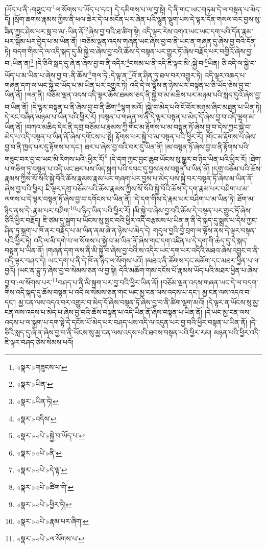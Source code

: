 །ཡོད་པ་ནི་:གཟུང་བ་\footnote{«སྣར་»གཟུངས་པ་}ལ་སོགས་པ་ཡོད་པ་དང་། དེ་དམིགས་པ་ལ་བྱ་སྟེ། དེ་ནི་གང་ཡང་གཏམ་དེ་ལ་བསྟན་པ་མེད་དོ། །སྲོག་ཆགས་རྣམས་ཀྱིས་ནི་ཕལ་ཆེར་དེ་ལ་མངོན་པར་ཞེན་པའི་ལྷུན་སྡུག་པས་དེ་ལྟར་དོན་གསལ་བར་བྱས་སུ་ཟིན་ཀྱང་ཤེས་པར་སླ་བ་མ་:ཡིན་ནོ་\footnote{«སྣར་»ཡིན་}ཞེས་བྱ་བའི་ཐ་ཚིག་སྟེ། འདི་ལྟར་རེས་འགའ་ཡང་ཡང་དག་པའི་དོན་རྣམ་པར་སྒོམ་པར་བྱེད་པ་མ་ཡིན་ནོ། །བཅོམ་ལྡན་འདས་གཞན་ཡང་ཞེས་བྱ་བ་ནི་ཡང་ན་གཞན་དུ་ཞེས་བྱ་བའི་དོན་ཏེ། བདག་གིས་དེ་ལ་འདི་སྐད་དུ་མི་སྐྱེ་བ་ཞེས་བྱ་བའི་ཆོས་དེ་བསྟན་པར་གྱུར་ཏོ་ཞེས་བརྗོད་པར་བགྱིའོ་ཞེས་བྱ་བ་:ཡིན་ན།\footnote{«སྣར་»ཡིན་ཏེ།} །དེ་ཅིའི་སླད་དུ་ཞེ་ན་ཞེས་བྱ་བ་ནི་འདིར་\footnote{«སྣར་»འདིས་}བསམ་པ་ནི་འདི་ཇི་ལྟར་མི་:སྐྱེ་བ་\footnote{«སྣར་»«པེ་»སྐྱེ་བ་ཡོད་པ་}ཡིན། ཅི་འདི་ལ་སྐྱེ་བ་ཡོད་པ་མ་ཡིན་པ་ཞེས་བྱ་བ་:ནི་ཆོས་\footnote{«སྣར་»«པེ་»ནི་}གལ་ཏེ་:དེ་ལྟ་ན་\footnote{«སྣར་»«པེ་»དེ་ལྟ་}འོ་ན་ཤིན་ཏུ་ཐལ་བར་འགྱུར་ཏེ། འདི་ལྟར་འཆད་པ་གཞན་དག་ལ་ཡང་སྐྱེ་བ་ཡོད་པ་མ་ཡིན་པར་འགྱུར་ཏེ། འདི་དེ་ལ་ལྟོས་ན་ཉེས་པར་བསྟན་པ་ཅི་ཡོད་ཅེས་བྱ་བ་ཡིན་ནོ། །ལན་ནི། བཅོམ་ལྡན་འདས་འདི་ལྟར་ཆོས་ཐམས་ཅད་ནི་སྐྱེ་བ་མ་མཆིས་པར་མཉམ་པའི་སླད་དུའོ་ཞེས་བྱ་བ་ཡིན་ནོ། །དེ་ལྟར་བསྟན་པ་ནི་ཞེས་བྱ་བ་ནི་ཚིག་\footnote{«སྣར་»«པེ་»ཚིག་གི་}ལྷག་མའོ། །སྐྱེ་བ་མེད་པའི་ངོ་བོར་མཉམ་ཞིང་མཐུན་པ་ཡིན་ཏེ། དེ་རང་བཞིན་མཉམ་པ་ཡིན་པའི་ཕྱིར་རོ། །བསྟན་པ་གཞན་ལ་ནི་དེ་ལྟར་བསྟན་པ་མེད་དོ་ཞེས་བྱ་བ་འདི་ལྷག་མ་ཡིན་ནོ། །བཀའ་མཆིད་དེར་ནི་དགྲ་བཅོམ་པ་རྣམས་ཀྱི་གོང་མ་རྟོགས་པ་མ་བསྟན་ཏོ་ཞེས་བྱ་བ་དེས་ཀྱང་སྐྱེ་བ་མེད་པ་འདི་བསྟན་པ་ཡིན་ནོ་ཞེས་དགོངས་པ་སྟེ། རྟོགས་པར་སྐྱེ་བ་མ་བསྟན་པའི་ཕྱིར་རོ། །གོང་མ་རྟོགས་པ་ཞེས་བྱ་བ་ནི་ཁྱད་པར་དུ་རྟོགས་པ་དང་། ཐར་པ་ཞེས་བྱ་བའི་བར་དུ་ཡིན་ནོ། །མ་བསྟན་ཏོ་ཞེས་བྱ་བ་ནི་རྟོགས་པའི་གཟུང་བར་བྱ་བ་ཡང་མི་རིགས་པའི་:ཕྱིར་རོ།\footnote{«སྣར་»«པེ་»ཕྱིར་ཏེ།} །དེ་དག་ཀྱང་བྱང་ཆུབ་ཡོངས་སུ་སྒྱུར་བ་ཉིད་ཡིན་པའི་ཕྱིར་རོ། །ཐེག་པ་གཅིག་ཏུ་བསྟན་པ་འདི་ཡང་ཐར་པས་ཡིད་སྐྲག་པའི་དབང་དུ་བྱས་ནས་བསྟན་པ་ཡིན་ནོ། །དགྲ་བཅོམ་པའི་ཆོས་རྣམས་ཀྱིས་སོ་སོའི་སྐྱེ་བོའི་ཆོས་རྣམས་རྣམ་པར་གཞག་པར་བྱས་པ་མེད་པས་སྐྱེ་བར་བསྟན་ཏོ་ཞེས་མ་ཡིན་ནོ་ཞེས་བྱ་བའི་ཕྱིར། ཇི་ལྟར་དགྲ་བཅོམ་པའི་ཆོས་རྣམས་ཀྱིས་སོ་སོའི་སྐྱེ་བོའི་ཆོས་དེ་དག་རྣམ་པར་བཤིག་པ་མ་ལགས་པ་དེ་ལྟར་བསྟན་ཏོ་ཞེས་བྱ་བ་དགོངས་པ་ཡིན་ནོ། །དེ་དག་གིས་དེ་རྣམ་པར་བཤིག་པ་མ་ཡིན་ཏེ། ཐོག་མ་ཉིད་ནས་དེ་:རྣམ་པར་བཤིག་\footnote{«སྣར་»«པེ་»རྣམ་པར་ཞིག་}པ་ཉིད་ཡིན་པའི་ཕྱིར་རོ། །མི་སྐྱེ་བ་ཞེས་བྱ་བའི་ཆོས་དེ་བསྟན་པར་གྱུར་ཏོ་ཞེས་ཅིའི་ཕྱིར་བརྗོད། ཇི་ཙམ་དུ་སྐྲག་པ་ཡོངས་སུ་སྤང་བའི་ཕྱིར་འདི་བརྩམས་པ་ཡིན་ན་ནི་དེ་སྐད་དུ་སྨྲས་པ་དེས་ཀྱང་ཤིན་ཏུ་སྐྲག་པ་ཁོ་ནར་བརྗོད་པ་མ་ཡིན་ནམ་ཞེ་ན་ཉེས་པ་མེད་དེ། གདུལ་བྱའི་བྱེ་བྲག་ལ་ལྟོས་ནས་དེ་ལྟར་བསྟན་པའི་ཕྱིར་ཏེ། འདི་ལ་མི་དགེ་བ་ལ་སོགས་པ་སྐྱེ་བ་མ་ཡིན་ནོ་ཞེས་གང་དག་འཛིན་པ་དེ་དག་གི་ཆེད་དུ་དེ་སྐད་བསྟན་པ་ཡིན་ནོ། །གཞན་དག་ལས་ནི་མི་སྐྱེ་བ་ཞེས་བྱ་བའི་ས་འདིར་ཡང་དག་པར་འདིའི་མཐའ་ཞེས་འབྱུང་བ་ནི་འདི་ལྟར་བཤད་དེ། ཡང་དག་པ་ནི་དེ་ཁོ་ན་ཉིད་ལ་སོགས་པའོ། །མཐའ་ནི་ཚོགས་དང་མཆོག་དང་མཐར་ཕྱིན་པ་ལ་བྱའོ། །ཡང་ན་བྷུ་ཏ་ཞེས་བྱ་བ་སེམས་ཅན་ལ་བྱ་སྟེ། དེའི་མཆོག་གམ་དངོས་པོ་རྣམས་ཡོད་པའི་མཐར་ཕྱིན་པ་ཞེས་བྱ་བ་:ལ་སོགས་པར་\footnote{«སྣར་»«པེ་»ལ་སོགས་པ་}བཤད་པ་ནི་མི་སྐྲག་པར་བྱ་བའི་ཕྱིར་ཡིན་ནོ། །བཅོམ་ལྡན་འདས་གཞན་ཡང་དེ་ལ་བདག་གིས་འདི་སྐད་དུ་ཆོས་བསྟན་པ་འདི་ལ་སེམས་ཅན་གང་ཡང་མྱ་ངན་ལས་འདས་པ་དང་། མྱ་ངན་ལས་འདའ་བ་དང་། མྱ་ངན་ལས་འདའ་བར་འགྱུར་བ་མེད་དོ་ཞེས་བསྟན་ཏོ་ཞེས་བྱ་བ་ནི་ཚིག་ལྷག་མའོ། །དེ་ལྟར་ན་ཡོངས་སུ་མྱ་ངན་ལས་འདས་པ་མེད་པ་ཞེས་བྱ་བའི་ཆོས་བསྟན་པ་འདི་ཡིན་ནོ་ཞེས་བསྟན་པ་ཡིན་ནོ། །དེ་ཡང་མྱ་ངན་ལས་འདས་པ་ལ་སྐྲག་པ་དག་སྟེ་དེ་དངོས་པོ་མེད་པར་བཤད་པས་འདི་ལ་འདུན་པར་བྱ་བའི་ཕྱིར་བསྟན་པ་ཡིན་ནོ། །དེ་ཅིའི་སླད་དུ་ཞེ་ན་ཞེས་བྱ་བ་ནི་ཡོངས་སུ་མྱ་ངན་ལས་འདས་པའི་ཐབས་བསྟན་པའི་ཕྱིར་རམ། མཉན་པའི་ཕྱིར་འདི་ཇི་ལྟར་བཤད་ཅེས་སེམས་པའོ། 